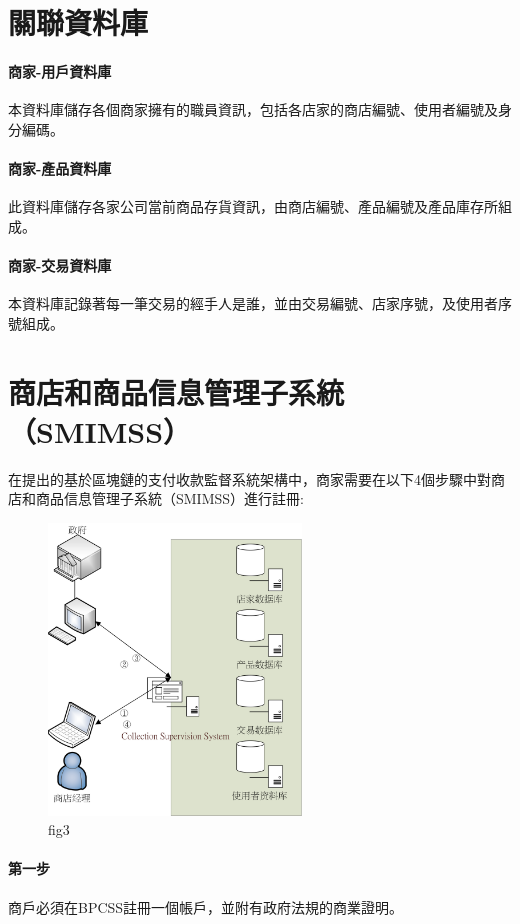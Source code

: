 		\section{關聯資料庫}
		\paragraph{商家-用戶資料庫}本資料庫儲存各個商家擁有的職員資訊，包括各店家的商店編號、使用者編號及身分編碼。
		\paragraph{商家-產品資料庫}此資料庫儲存各家公司當前商品存貨資訊，由商店編號、產品編號及產品庫存所組成。
		\paragraph{商家-交易資料庫}本資料庫記錄著每一筆交易的經手人是誰，並由交易編號、店家序號，及使用者序號組成。

	\section{商店和商品信息管理子系統（SMIMSS）}
	在提出的基於區塊鏈的支付收款監督系統架構中，商家需要在以下4個步驟中對商店和商品信息管理子系統（SMIMSS）進行註冊:

	\begin{figure}[h]
		\centering
		\includegraphics[width = 0.6\textwidth]{fig3.png}
		\caption{fig3}\label{fig3}
	\end{figure}

		\paragraph{第一步}商戶必須在BPCSS註冊一個帳戶，並附有政府法規的商業證明。
